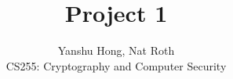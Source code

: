 \documentclass[12pt]{article}
\newenvironment{question}[2][Question]{\begin{trivlist}
\item[\hskip \labelsep {\bfseries #1}\hskip \labelsep {\bfseries #2.}]}{\end{trivlist}}
\begin{document}
\title{Project 1}
\author{Yanshu Hong, Nat Roth\\ 
CS255: Cryptography and Computer Security} 

\maketitle 
 

\begin{question}{1}


\end{question}



\begin{question}{2}


\end{question}



\begin{question}{3} 


\end{question}



\begin{question}{4} 


\end{question}



\begin{question}{5} 


\end{question}

 
 
\end{document}
